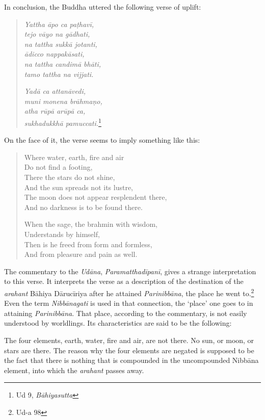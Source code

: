 In conclusion, the Buddha uttered the following verse of uplift:

\begin{quote}
\emph{Yattha āpo ca paṭhavī,}\\
\emph{tejo vāyo na gādhati,}\\
\emph{na tattha sukkā jotanti,}\\
\emph{ādicco nappakāsati,}\\
\emph{na tattha candimā bhāti,}\\
\emph{tamo tattha na vijjati.}

\emph{Yadā ca attanāvedi,}\\
\emph{muni monena brāhmaṇo,}\\
\emph{atha rūpā arūpā ca,}\\
\emph{sukhadukkhā pamuccati.}\footnote{Ud 9, \emph{Bāhiyasutta}}
\end{quote}

On the face of it, the verse seems to imply something like this:

\begin{quote}
Where water, earth, fire and air\\
Do not find a footing,\\
There the stars do not shine,\\
And the sun spreads not its lustre,\\
The moon does not appear resplendent there,\\
And no darkness is to be found there.

When the sage, the brahmin with wisdom,\\
Understands by himself,\\
Then is he freed from form and formless,\\
And from pleasure and pain as well.
\end{quote}

The commentary to the \emph{Udāna}, \emph{Paramatthadīpanī}, gives a strange interpretation to this verse. It interprets the verse as a description of the destination of the \emph{arahant} Bāhiya Dārucīriya after he attained \emph{Parinibbāna}, the place he went to.\footnote{Ud-a 98} Even the term \emph{Nibbānagati} is used in that connection, the `place' one goes to in attaining \emph{Parinibbāna}. That place, according to the commentary, is not easily understood by worldlings. Its characteristics are said to be the following:

The four elements, earth, water, fire and air, are not there. No sun, or moon, or stars are there. The reason why the four elements are negated is supposed to be the fact that there is nothing that is compounded in the uncompounded Nibbāna element, into which the \emph{arahant} passes away.

